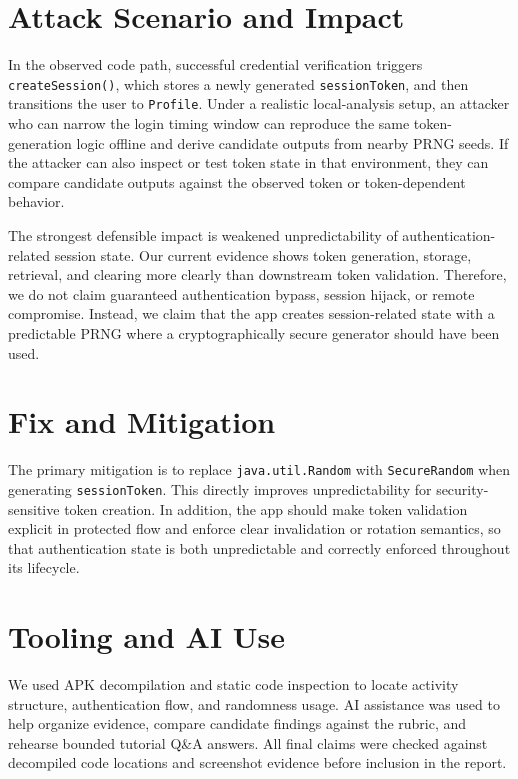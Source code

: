 \documentclass[letterpaper,twocolumn,10pt]{article}
\begin{document}
\section{Attack Scenario and Impact}

In the observed code path, successful credential verification triggers \texttt{createSession()}, which stores a newly generated \texttt{sessionToken}, and then transitions the user to \texttt{Profile}. Under a realistic local-analysis setup, an attacker who can narrow the login timing window can reproduce the same token-generation logic offline and derive candidate outputs from nearby PRNG seeds. If the attacker can also inspect or test token state in that environment, they can compare candidate outputs against the observed token or token-dependent behavior.

The strongest defensible impact is weakened unpredictability of authentication-related session state. Our current evidence shows token generation, storage, retrieval, and clearing more clearly than downstream token validation. Therefore, we do not claim guaranteed authentication bypass, session hijack, or remote compromise. Instead, we claim that the app creates session-related state with a predictable PRNG where a cryptographically secure generator should have been used.

\section{Fix and Mitigation}

The primary mitigation is to replace \texttt{java.util.Random} with \texttt{SecureRandom} when generating \texttt{sessionToken}. This directly improves unpredictability for security-sensitive token creation. In addition, the app should make token validation explicit in protected flow and enforce clear invalidation or rotation semantics, so that authentication state is both unpredictable and correctly enforced throughout its lifecycle.

\section{Tooling and AI Use}

We used APK decompilation and static code inspection to locate activity structure, authentication flow, and randomness usage. AI assistance was used to help organize evidence, compare candidate findings against the rubric, and rehearse bounded tutorial Q\&A answers. All final claims were checked against decompiled code locations and screenshot evidence before inclusion in the report.
\end{document}
